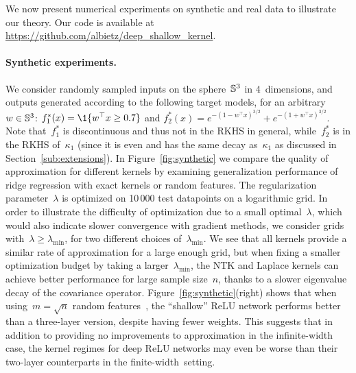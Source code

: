 
We now present numerical experiments on synthetic and real data to illustrate our theory.
Our code is available at \url{https://github.com/albietz/deep_shallow_kernel}.

\paragraph{Synthetic experiments.}
We consider randomly sampled inputs on the sphere~${\mathbb S}^3$ in 4~dimensions, and outputs generated according to the following target models, for an arbitrary~$w \in {\mathbb S}^3$:
$f_1^*(x) = \1\{w^{\top}x \geq 0.7\}$ and $f_2^*(x) = e^{-(1 - w^\top x)^{3/2}} + e^{-(1+w^\top x)^{3/2}}$.
Note that~$f_1^*$ is discontinuous and thus not in the RKHS in general, while~$f_2^*$ is in the RKHS of~$\kappa_1$ (since it is even and has the same decay as~$\kappa_1$ as discussed in Section~\ref{sub:extensions}).
In Figure~\ref{fig:synthetic} we compare the quality of approximation for different kernels by examining generalization performance of ridge regression with exact kernels or random features.
The regularization parameter~$\lambda$ is optimized on 10\,000 test datapoints on a logarithmic grid.
In order to illustrate the difficulty of optimization due to a small optimal~$\lambda$, which would also indicate slower convergence with gradient methods, we consider grids with~$\lambda \geq \lambda_{\min}$, for two different choices of~$\lambda_{\min}$.
We see that all kernels provide a similar rate of approximation for a large enough grid, but when fixing a smaller optimization budget by taking a larger~$\lambda_{\min}$, the NTK and Laplace kernels can achieve better performance for large sample size~$n$, thanks to a slower eigenvalue decay of the covariance operator.
Figure~\ref{fig:synthetic}(right) shows that when using~$m = \sqrt{n}$ random features~\citep[which can achieve optimal rates in some settings, see][]{rudi2017generalization}, the ``shallow'' ReLU network performs better than a three-layer version, despite having fewer weights.
This suggests that in addition to providing no improvements to approximation in the infinite-width case, the kernel regimes for deep ReLU networks may even be worse than their two-layer counterparts in the finite-width~setting.

